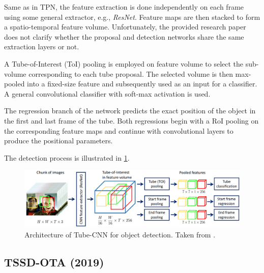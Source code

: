 Same as in TPN, the feature extraction is done independently on each frame using some general extractor, e.g., \textit{ResNet}. Feature maps are then stacked to form a spatio-temporal feature volume. Unfortunately, the provided research paper does not clarify whether the proposal and detection networks share the same extraction layers or not.

A Tube-of-Interest (ToI) pooling is employed on feature volume to select the sub-volume corresponding to each tube proposal. The selected volume is then max-pooled into a fixed-size feature and subsequently used as an input for a classifier. A general convolutional classifier with soft-max activation is used. 

The regression branch of the network predicts the exact position of the object in the first and last frame of the tube. Both regressions begin with a RoI pooling on the corresponding feature maps and continue with convolutional layers to produce the positional parameters. 

The detection process is illustrated in \cref{fig:tubecnn}.


\begin{figure}
    \centering
    \includegraphics[width=\textwidth]{img/tubecnn}
    \caption{Architecture of Tube-CNN for object detection. Taken from \cite[fig. 2]{bib:tubeCNN}.}
    \label{fig:tubecnn}
\end{figure}


\subsection{TSSD-OTA (2019)}
\citeauthor{bib:tssd} \cite{bib:tssd}











